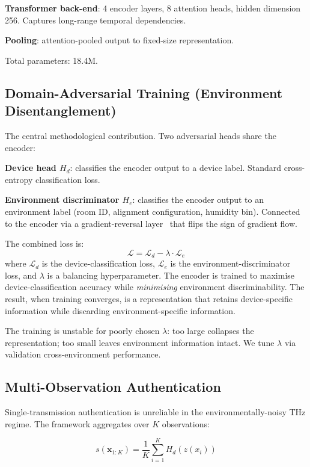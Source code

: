 \documentclass[sigconf,nonacm]{acmart}
\begin{document}
\textbf{Transformer back-end}: 4 encoder layers, 8 attention heads,
hidden dimension 256. Captures long-range temporal dependencies.

\textbf{Pooling}: attention-pooled output to fixed-size representation.

Total parameters: 18.4M.

\subsection{Domain-Adversarial Training (Environment Disentanglement)}

The central methodological contribution. Two adversarial heads share
the encoder:

\textbf{Device head $H_d$}: classifies the encoder output to a
device label. Standard cross-entropy classification loss.

\textbf{Environment discriminator $H_e$}: classifies the encoder
output to an environment label (room ID, alignment configuration,
humidity bin). Connected to the encoder via a gradient-reversal
layer~\cite{ganin2016dann} that flips the sign of gradient flow.

The combined loss is:
\begin{equation}
  \mathcal{L} = \mathcal{L}_d - \lambda \cdot \mathcal{L}_e
\end{equation}
where $\mathcal{L}_d$ is the device-classification loss,
$\mathcal{L}_e$ is the environment-discriminator loss, and $\lambda$
is a balancing hyperparameter. The encoder is trained to maximise
device-classification accuracy while \emph{minimising} environment
discriminability. The result, when training converges, is a
representation that retains device-specific information while
discarding environment-specific information.

The training is unstable for poorly chosen $\lambda$: too large
collapses the representation; too small leaves environment
information intact. We tune $\lambda$ via validation
cross-environment performance.

\subsection{Multi-Observation Authentication}

Single-transmission authentication is unreliable in the
environmentally-noisy THz regime. The framework aggregates over $K$
observations:

\begin{equation}
  s(\mathbf{x}_{1:K}) = \frac{1}{K} \sum_{i=1}^{K} H_d(z(x_i))
\end{equation}
\end{document}
